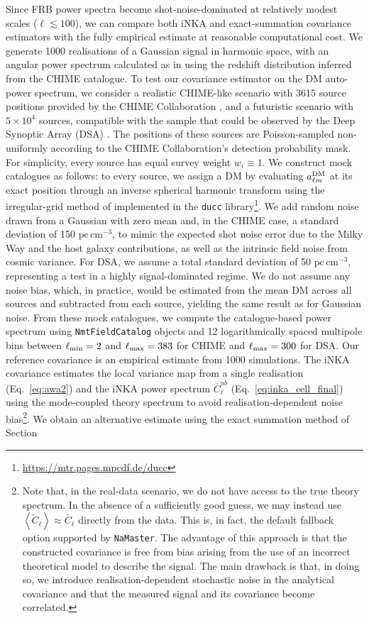 \documentclass[%
 reprint,
superscriptaddress,
nofootinbib,
 amsmath,amssymb,
 aps,
 prd,
]{revtex4-2}
\newcommand{\nmt}{{\tt NaMaster}\xspace}
\begin{document}
    Since FRB power spectra become shot-noise-dominated at relatively modest scales ($\ell\lesssim 100$), we can compare both iNKA and exact-summation covariance estimators with the fully empirical estimate at reasonable computational cost. We generate 1000 realisations of a Gaussian signal in harmonic space, with an angular power spectrum calculated as in \cite{2026JCAP...06..006R} using the redshift distribution inferred from the CHIME catalogue. To test our covariance estimator on the DM auto-power spectrum, we consider a realistic CHIME-like scenario with 3615 source positions provided by the CHIME Collaboration \cite{2026ApJS..283...34C}, and a futuristic scenario with $5\times 10^4$ sources, compatible with the sample that could be observed by the Deep Synoptic Array (DSA) \cite{2019BAAS...51g.255H,2025JCAP...12..035B}. The positions of these sources are Poisson-sampled non-uniformly according to the CHIME Collaboration's detection probability mask. For simplicity, every source has equal survey weight $w_i\equiv 1$. We construct mock catalogues as follows: to every source, we assign a DM by evaluating $a^{\rm DM}_{\ell m}$ at its exact position through an inverse spherical harmonic transform using the irregular-grid method of \cite{2304.10431} implemented in the {\tt ducc} library\footnote{\url{https://mtr.pages.mpcdf.de/ducc}}. We add random noise drawn from a Gaussian with zero mean and, in the CHIME case, a standard deviation of 150 $\text{pc}\,\text{cm}^{-3}$, to mimic the expected shot noise error due to the Milky Way and the host galaxy contributions, as well as the intrinsic field noise from cosmic variance. For DSA, we assume a total standard deviation of 50 $\text{pc}\,\text{cm}^{-3}$, representing a test in a highly signal-dominated regime. We do not assume any noise bias, which, in practice, would be estimated from the mean DM across all sources and subtracted from each source, yielding the same result as for Gaussian noise. From these mock catalogues, we compute the catalogue-based power spectrum using \texttt{NmtFieldCatalog} objects and 12 logarithmically spaced multipole bins between $\ell_{\rm min}=2$ and $\ell_{\rm max}=383$ for CHIME and $\ell_{\rm max} = 300$ for DSA. Our reference covariance is an empirical estimate from 1000 simulations. The iNKA covariance estimates the local variance map from a single realisation (Eq.~\ref{eq:awa2}) and the iNKA power spectrum $\overline{C}^{ab}_\ell$ (Eq.~\ref{eq:inka_cell_final}) using the mode-coupled theory spectrum to avoid realisation-dependent noise bias\footnote{Note that, in the real-data scenario, we do not have access to the true theory spectrum. In the absence of a sufficiently good guess, we may instead use $\left\langle \tilde{C}_\ell \right\rangle\approx\tilde{C_\ell}$ directly from the data. This is, in fact, the default fallback option supported by \nmt. The advantage of this approach is that the constructed covariance is free from bias arising from the use of an incorrect theoretical model to describe the signal. The main drawback is that, in doing so, we introduce realisation-dependent stochastic noise in the analytical covariance and that the measured signal and its covariance become correlated.}.  We obtain an alternative estimate using the exact summation method of Section 
\end{document}
